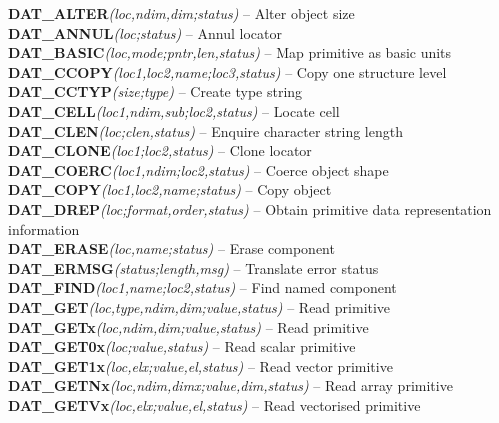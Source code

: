 \documentclass[11pt]{article}
\newcommand{\htmlref}[2]{#1}
\newcommand{\st}[1]{{\em{#1}}}
\begin{document}
\label{appendix:datroutines}
{\bf \htmlref{DAT\_ALTER}{DAT_ALTER}}\st{(loc,ndim,dim;status)} -- Alter object size \\
{\bf \htmlref{DAT\_ANNUL}{DAT_ANNUL}}\st{(loc;status)} -- Annul locator \\
{\bf \htmlref{DAT\_BASIC}{DAT_BASIC}}\st{(loc,mode;pntr,len,status)} -- Map primitive as basic units \\
{\bf \htmlref{DAT\_CCOPY}{DAT_CCOPY}}\st{(loc1,loc2,name;loc3,status)} -- Copy one structure level\\
{\bf \htmlref{DAT\_CCTYP}{DAT_CCTYP}}\st{(size;type)} -- Create type string\\
{\bf \htmlref{DAT\_CELL}{DAT_CELL}}\st{(loc1,ndim,sub;loc2,status)} -- Locate cell \\
{\bf \htmlref{DAT\_CLEN}{DAT_CLEN}}\st{(loc;clen,status)} -- Enquire character string length \\
{\bf \htmlref{DAT\_CLONE}{DAT_CLONE}}\st{(loc1;loc2,status)} -- Clone locator \\
{\bf \htmlref{DAT\_COERC}{DAT_COERC}}\st{(loc1,ndim;loc2,status)} -- Coerce object shape \\
{\bf \htmlref{DAT\_COPY}{DAT_COPY}}\st{(loc1,loc2,name;status)} -- Copy object \\
{\bf \htmlref{DAT\_DREP}{DAT_DREP}}\st{(loc;format,order,status)} -- Obtain primitive data representation information\\
{\bf \htmlref{DAT\_ERASE}{DAT_ERASE}}\st{(loc,name;status)} -- Erase component \\
{\bf \htmlref{DAT\_ERMSG}{DAT_ERMSG}}\st{(status;length,msg)} -- Translate error status\\
{\bf \htmlref{DAT\_FIND}{DAT_FIND}}\st{(loc1,name;loc2,status)} -- Find named component \\
{\bf \htmlref{DAT\_GET}{DAT_GET}}\st{(loc,type,ndim,dim;value,status)} -- Read primitive \\
{\bf \htmlref{DAT\_GETx}{DAT_GETx}}\st{(loc,ndim,dim;value,status)} -- Read primitive \\
{\bf \htmlref{DAT\_GET0x}{DAT_GET0x}}\st{(loc;value,status)} -- Read scalar primitive\\
{\bf \htmlref{DAT\_GET1x}{DAT_GET1x}}\st{(loc,elx;value,el,status)} -- Read vector primitive\\
{\bf \htmlref{DAT\_GETNx}{DAT_GETNx}}\st{(loc,ndim,dimx;value,dim,status)} -- Read array primitive\\
{\bf \htmlref{DAT\_GETVx}{DAT_GETVx}}\st{(loc,elx;value,el,status)} -- Read vectorised primitive\\
\end{document}

